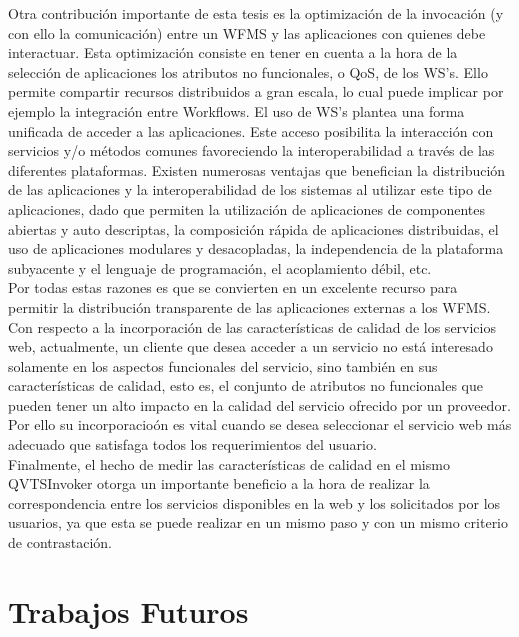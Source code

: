 Otra contribución importante de esta tesis es la optimización de la invocación (y con ello la comunicación) entre un WFMS y las aplicaciones con quienes debe interactuar. Esta optimización consiste en tener en cuenta a la hora de la selección de aplicaciones los atributos no funcionales, o QoS, de los WS's. Ello permite compartir recursos distribuidos a gran escala, lo cual puede implicar por ejemplo la integración entre Workflows.
El uso de WS's plantea una forma unificada de acceder a las aplicaciones. Este acceso posibilita la interacción con servicios y/o métodos comunes favoreciendo la interoperabilidad a través de las diferentes plataformas. Existen numerosas ventajas que benefician la distribución de las aplicaciones y la interoperabilidad de los sistemas al utilizar este tipo de aplicaciones, dado que permiten la utilización de aplicaciones de componentes abiertas y auto descriptas, la composición rápida de aplicaciones distribuidas, el uso de aplicaciones modulares y desacopladas, la independencia de la plataforma subyacente y el lenguaje de programación, el acoplamiento débil, etc.\\

Por todas estas razones es que se convierten en un excelente recurso para permitir la distribución transparente de las aplicaciones externas a los WFMS.\\

Con respecto a la incorporación de las características de calidad de los servicios web, actualmente, un cliente que desea acceder a un servicio no está interesado solamente en los aspectos funcionales del servicio, sino también en sus características de calidad, esto es, el conjunto de atributos no funcionales que pueden tener un alto impacto en la calidad del servicio ofrecido por un proveedor. Por ello su incorporacioón es vital cuando se desea seleccionar el servicio web más adecuado que satisfaga todos los requerimientos del usuario.\\

Finalmente, el hecho de medir las características de calidad en el mismo QVTSInvoker otorga un importante beneficio a la hora de realizar la correspondencia entre los servicios disponibles en la web y los solicitados por los usuarios, ya que esta se puede realizar en un mismo paso y con un mismo criterio de contrastación.

\section{Trabajos Futuros}

